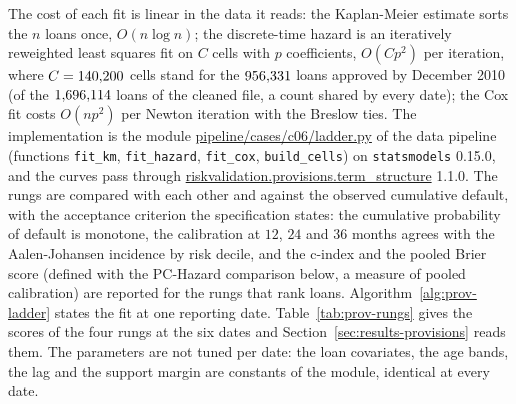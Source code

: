 The cost of each fit is linear in the data it reads: the Kaplan-Meier estimate sorts the $n$ loans once, $O(n\log n)$; the discrete-time hazard is an iteratively reweighted least squares fit on $C$ cells with $p$ coefficients, $O(Cp^{2})$ per
iteration, where $C=140{,}200$ cells stand for the $956{,}331$ loans approved by December 2010 (of the $1{,}696{,}114$ loans of the cleaned file, a count shared by every date); the Cox fit costs $O(np^{2})$ per Newton iteration with the Breslow ties. The implementation is
the module \url{pipeline/cases/c06/ladder.py} of the data pipeline (functions \texttt{fit\_km}, \texttt{fit\_hazard}, \texttt{fit\_cox}, \texttt{build\_cells}) on \texttt{statsmodels} 0.15.0,
and the curves pass through \url{riskvalidation.provisions.term_structure} 1.1.0. The rungs are compared with each other and against the observed
cumulative default, with the acceptance criterion the specification states: the cumulative probability of default is monotone, the calibration at $12$, $24$ and $36$ months agrees with the Aalen-Johansen
incidence by risk decile, and the c-index and the pooled Brier score (defined with the PC-Hazard comparison below, a measure of pooled calibration) are reported for the rungs that rank loans. Algorithm~\ref{alg:prov-ladder} states the fit at one reporting date. Table~\ref{tab:prov-rungs} gives the scores of the four rungs at the six dates and
Section~\ref{sec:results-provisions} reads them. The parameters are not tuned per date: the loan covariates, the age bands, the lag and the support margin are constants of the module, identical at every date.

